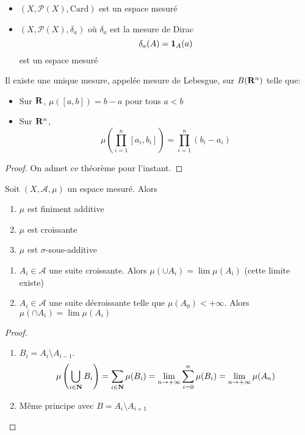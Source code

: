 \begin{ex}
\begin{itemize}
    \item $(X, \mathcal  P(X), \mathrm{Card})$ est un espace mesuré
    \item $(X, \mathcal  P(X), \delta_a)$ où $\delta_a$ est la mesure de Dirac  \[
            \delta_a(A)=\bm{1}_A(a)
    \] 
    est un espace mesuré
\end{itemize}
\end{ex}

\begin{thm}
    Il existe une unique mesure, appelée mesure de Lebesgue, sur $B(\mathbf R^n)$ telle que: \begin{itemize}
        \item Sur $\mathbf R$, $\mu([a, b])=b-a$ pour tous  $a<b$
        \item Sur $\mathbf R^n$, \[
                \mu \left( \prod_{i=1}^{n} [a_i, b_i] \right)= \prod_{i=1}^{n} (b_i-a_i)
        \] 
    \end{itemize}
\end{thm}

\begin{proof}
On admet ce théorème pour l'instant.
\end{proof}

\begin{prop}
    Soit $(X, \mathcal  A, \mu)$ un espace mesuré. Alors \begin{enumerate}[label=(\alph*)]
        \item $\mu$ est finiment additive
        \item $\mu$ est croissante
        \item $\mu$ est  $\sigma$-sous-additive
    \end{enumerate}
\end{prop}

\begin{prop}
\begin{enumerate}
    \item $A_i \in  \mathcal  A$ une suite croissante. Alors $\mu(\cup A_i)=\lim \mu(A_i)$ (cette limite existe)
    \item  $A_i \in  \mathcal  A$ une suite décroissante telle que $\mu(A_0)<+\infty$. Alors $\mu(\cap A_i)=\lim \mu(A_i)$
\end{enumerate}
\end{prop}

\begin{proof}
\begin{enumerate}
    \item $B_i=A_i\setminus A_{i-1}$. \[
            \mu \left(\bigcup_{i \in  \mathbf N}B_i\right)= \sum_{i \in  \mathbf N} \mu(B_i)=\lim_{n\to +\infty} \sum_{i=0}^{n} \mu(B_i)=\lim_{n \to  +\infty} \mu(A_n)
    \] 
    \item Même principe avec $B=A_i \setminus A_{i+1}$
\end{enumerate}
\end{proof}

